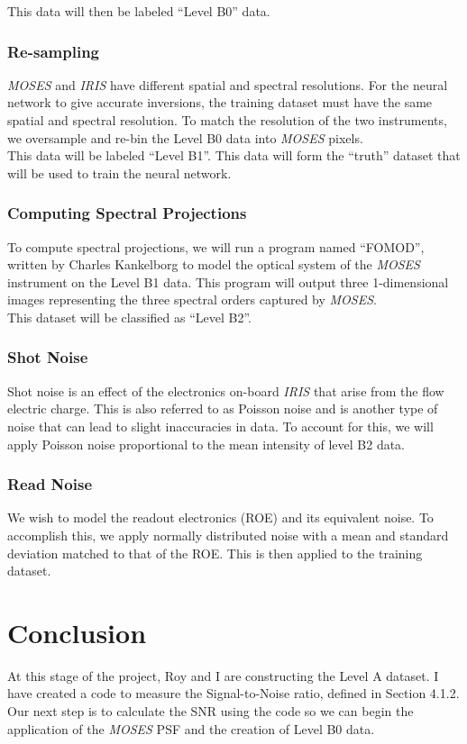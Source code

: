 \documentclass[10pt,a4paper,titlepage]{article}
\begin{document}
				This data will then be labeled ``Level B0'' data.
			
			\subsubsection{Re-sampling}
				\textit{MOSES} and \textit{IRIS} have different spatial and spectral resolutions. For the neural network to give accurate inversions, the training dataset must have the same spatial and spectral resolution. To match the resolution of the two instruments, we oversample and re-bin the Level B0 data into \textit{MOSES} pixels.\\
			
				This data will be labeled ``Level B1''. This data will form the ``truth'' dataset that will be used to train the neural network.
			
			\subsubsection{Computing Spectral Projections}
				To compute spectral projections, we will run a program named ``FOMOD'', written by Charles Kankelborg to model the optical system of the \textit{MOSES} instrument on the Level B1 data. This program will output three 1-dimensional images representing the three spectral orders captured by \textit{MOSES}.\\
				
				This dataset will be classified as ``Level B2''.

			\subsubsection{Shot Noise}
				Shot noise is an effect of the electronics on-board \textit{IRIS} that arise from the flow electric charge. This is also referred to as Poisson noise and is another type of noise that can lead to slight inaccuracies in data. To account for this, we will apply Poisson noise proportional to the mean intensity of level B2 data.
			
			\subsubsection{Read Noise}
				We wish to model the readout electronics (ROE) and its equivalent noise. To accomplish this, we apply normally distributed noise with a mean and standard deviation matched to that of the ROE. This is then applied to the training dataset.
			
	\section{Conclusion}
		At this stage of the project, Roy and I are constructing the Level A dataset. I have created a code to measure the Signal-to-Noise ratio, defined in Section 4.1.2. Our next step is to calculate the SNR using the code so we can begin the application of the \textit{MOSES} PSF and the creation of Level B0 data.
		
	
	
\end{document}
